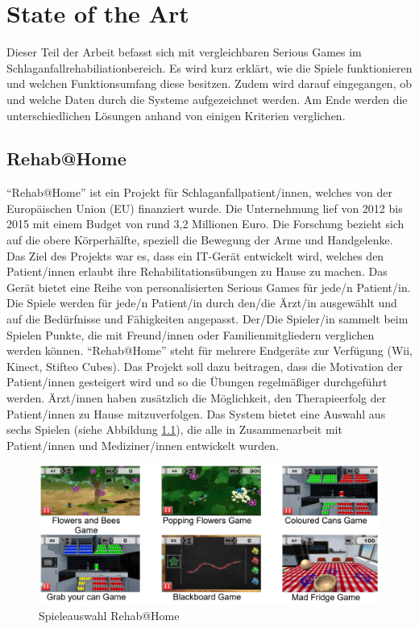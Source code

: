 \chapter{State of the Art}\label{sec:state-of-the-art}
Dieser Teil der Arbeit befasst sich mit vergleichbaren Serious Games im Schlaganfallrehabiliationbereich. Es wird kurz erklärt, wie die Spiele funktionieren und welchen Funktionsumfang diese besitzen. Zudem wird darauf eingegangen, ob und welche Daten durch die Systeme aufgezeichnet werden. Am Ende werden die unterschiedlichen Lösungen anhand von einigen Kriterien verglichen.

\section{Rehab@Home}\label{sec:rehab@home}
\enquote{Rehab@Home} ist ein Projekt für Schlaganfallpatient/innen, welches von der Europäischen Union (EU) finanziert wurde. Die Unternehmung lief von 2012 bis 2015 mit einem Budget von rund 3,2 Millionen Euro. Die Forschung bezieht sich auf die obere Körperhälfte, speziell die Bewegung der Arme und Handgelenke. Das Ziel des Projekts war es, dass ein IT-Gerät entwickelt wird, welches den Patient/innen erlaubt ihre Rehabilitationsübungen zu Hause zu machen. Das Gerät bietet eine Reihe von personalisierten Serious Games für jede/n Patient/in. Die Spiele werden für jede/n Patient/in durch den/die Ärzt/in ausgewählt und auf die Bedürfnisse und Fähigkeiten angepasst. Der/Die Spieler/in sammelt beim Spielen Punkte, die mit Freund/innen oder Familienmitgliedern verglichen werden können. \enquote{Rehab@Home} steht für mehrere Endgeräte zur Verfügung (Wii, Kinect, Stifteo Cubes). Das Projekt soll dazu beitragen, dass die Motivation der Patient/innen gesteigert wird und so die Übungen regelmäßiger durchgeführt werden. Ärzt/innen haben zusätzlich die Möglichkeit, den Therapieerfolg der Patient/innen zu Hause mitzuverfolgen. Das System bietet eine Auswahl aus sechs Spielen (siehe Abbildung \ref{fig:rehab@home:2016}), die alle in Zusammenarbeit mit Patient/innen und Mediziner/innen entwickelt wurden. \cite{stroke_patients_receive_home_rehabilitation:2016}\cite{rehab@home:2016}

\begin{figure}[h]
    \centering
	\includegraphics[width=1\linewidth]{figures/state_of_the_art/rehab@home}
	\caption{Spieleauswahl Rehab@Home \cite{figures:rehab@home:2016}}
	\label{fig:rehab@home:2016}
\end{figure}

